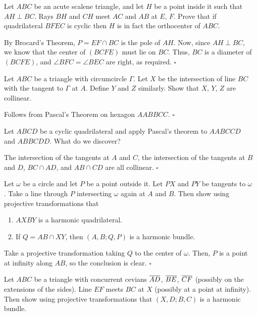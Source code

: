 \documentclass{article}
\begin{document}
\begin{problem}[9.28]{}
Let $ABC$ be an acute scalene triangle, and let $H$ be a point inside it such that $AH \perp BC$. Rays $BH$ and $CH$ meet $AC$ and $AB$ at $E$, $F$. Prove that if quadrilateral $BFEC$ is cyclic then $H$ is in fact the orthocenter of $ABC$. 
\end{problem}

By Brocard's Theorem, $P = EF \cap BC$ is the pole of $AH$. Now, since $AH \perp BC$, we know that the center of $(BCFE)$ must lie on $BC$. Thus, $BC$ is a diameter of $(BCFE)$, and $\angle BFC = \angle BEC$ are right, as required. $\square$

\begin{problem}[9.31]{}
Let $ABC$ be a triangle with circumcircle $\Gamma$. Let $X$ be the intersection of line $BC$ with the tangent to $\Gamma$ at $A$. Define $Y$ and $Z$ similarly. Show that $X$, $Y$, $Z$ are collinear.
\end{problem}

Follows from Pascal's Theorem on hexagon $AABBCC$. $\square$

\begin{problem}[9.32]{}
Let $ABCD$ be a cyclic quadrilateral and apply Pascal's theorem to $AABCCD$ and $ABBCDD$. What do we discover?
\end{problem}

The intersection of the tangents at $A$ and $C$, the intersection of the tangents at $B$ and $D$, $BC \cap AD$, and $AB \cap CD$ are all collinear. $\square$

\begin{problem}[9.36]{}
Let $\omega$ be a circle and let $P$ be a point outside it. Let $PX$ and $PY$ be tangents to $\omega$. Take a line through $P$ intersecting $\omega$ again at $A$ and $B$. Then show using projective transformations that
\begin{enumerate}[label=(\alph*)]
\item $AXBY$ is a harmonic quadrilateral.
\item If $Q = AB \cap XY$, then $(A, B; Q, P)$ is a harmonic bundle.
\end{enumerate}
\end{problem}

Take a projective transformation taking $Q$ to the center of $\omega$. Then, $P$ is a point at infinity along $AB$, so the conclusion is clear. $\square$

\begin{problem}[9.37]{}
Let $ABC$ be a triangle with concurrent cevians $\overline{AD}$, $\overline{BE}$, $\overline{CF}$ (possibly on the extensions of the sides). Line $EF$ meets $BC$
at $X$ (possibly at a point at infinity). Then show using projective transformations that $(X, D;B,C)$ is a harmonic bundle.
\end{problem}
\end{document}
